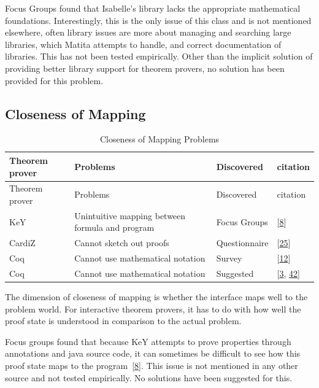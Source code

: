 \documentclass[
]{article}
\begin{document}
Focus Groups found that Isabelle's library lacks the appropriate
mathematical foundations. Interestingly, this is the only issue of this
class and is not mentioned elsewhere, often library issues are more
about managing and searching large libraries, which Matita attempts to
handle, and correct documentation of libraries. This has not been tested
empirically. Other than the implicit solution of providing better
library support for theorem provers, no solution has been provided for
this problem.

\hypertarget{closeness-of-mapping-1}{%
\subsection{Closeness of Mapping}\label{closeness-of-mapping-1}}

\hypertarget{tbl:closeness_of_mapping}{}
\begin{longtable}[]{@{}llll@{}}
\caption{\label{tbl:closeness_of_mapping}Closeness of Mapping
Problems}\tabularnewline
\toprule
Theorem prover & Problems & Discovered & citation \\
\midrule
\endfirsthead
\toprule
Theorem prover & Problems & Discovered & citation \\
\midrule
\endhead
KeY & Unintuitive mapping between formula and program & Focus Groups &
{[}\protect\hyperlink{ref-beckert_usability_2015}{8}{]} \\
CardiZ & Cannot sketch out proofs & Questionnaire &
{[}\protect\hyperlink{ref-kadoda_cognitive_2000}{25}{]} \\
Coq & Cannot use mathematical notation & Survey &
{[}\protect\hyperlink{ref-berman_development_2014}{12}{]} \\
Coq & Cannot use mathematical notation & Suggested &
{[}\protect\hyperlink{ref-asperti_user_2007}{3},
\protect\hyperlink{ref-zacchiroli_user_2007}{42}{]} \\
\bottomrule
\end{longtable}

The dimension of closeness of mapping is whether the interface maps well
to the problem world. For interactive theorem provers, it has to do with
how well the proof state is understood in comparison to the actual
problem.

Focus groups found that because KeY attempts to prove properties through
annotations and java source code, it can sometimes be difficult to see
how this proof state maps to the
program~{[}\protect\hyperlink{ref-beckert_usability_2015}{8}{]}. This
issue is not mentioned in any other source and not tested empirically.
No solutions have been suggested for this.
\end{document}
